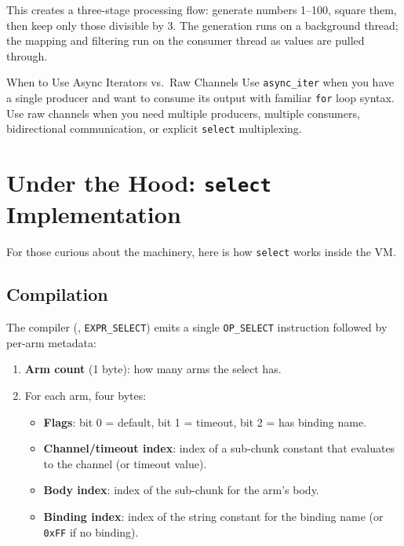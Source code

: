 This creates a three-stage processing flow: generate numbers 1--100, square them, then keep only those divisible by 3.
The generation runs on a background thread; the mapping and filtering run on the consumer thread as values are pulled through.

\begin{tipbox}{When to Use Async Iterators vs.\ Raw Channels}
Use \lstinline|async_iter| when you have a single producer and want to consume its output with familiar \lstinline|for| loop syntax.
Use raw channels when you need multiple producers, multiple consumers, bidirectional communication, or explicit \lstinline|select| multiplexing.
\end{tipbox}

\section{Under the Hood: \texttt{select} Implementation}\label{sec:select-internals}


For those curious about the machinery, here is how \lstinline|select| works inside the VM.

\subsection{Compilation}

The compiler (, \texttt{EXPR\_SELECT}) emits a single \lstinline|OP_SELECT| instruction followed by per-arm metadata:

\begin{enumerate}
  \item \textbf{Arm count} (1 byte): how many arms the select has.
  \item For each arm, four bytes:
    \begin{itemize}
      \item \textbf{Flags}: bit 0 = default, bit 1 = timeout, bit 2 = has binding name.
      \item \textbf{Channel/timeout index}: index of a sub-chunk constant that evaluates to the channel (or timeout value).
      \item \textbf{Body index}: index of the sub-chunk for the arm's body.
      \item \textbf{Binding index}: index of the string constant for the binding name (or \texttt{0xFF} if no binding).
    \end{itemize}
\end{enumerate}

